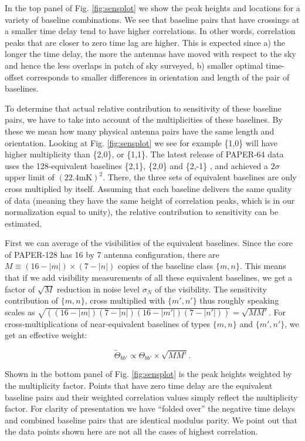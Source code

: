 \documentclass[twocolumn,apj,numberedappendix]{emulateapj}
\renewcommand\[{\begin{equation}}
\renewcommand\]{\end{equation}}
\begin{document}
In the top panel of Fig. \ref{fig:sensplot}
we show the peak heights and locations for a variety of baseline combinations.
We see that baseline pairs that have crossings at a smaller time delay
tend to have higher correlations. In other words, correlation peaks
that are closer to zero time lag are higher. This is expected since
a) the longer the time delay, the more the antennas have moved with respect
to the sky and hence the less overlaps in patch of sky surveyed, b) smaller optimal
time-offset corresponds to smaller differences in orientation and length of the 
pair of baselines. 




To determine that actual relative contribution to sensitivity of these
baseline pairs, we have to take into account of the multiplicities of
these baselines. By these we mean how many physical antenna pairs have the
same length and orientation. Looking at Fig. \ref{fig:sensplot}
we see for example \{1,0\} will have higher multiplicity than \{2,0\},
or \{1,1\}. The latest release of PAPER-64 data uses the 128-equivalent baselines \{2,1\},
\{2,0\} and \{2,-1\} \citep{Ali2015}, and achieved a $2\sigma$ upper
limit of $(22.4\text{mK})^{2}$. There, the three sets of equivalent baselines
are only cross multiplied by itself. Assuming that each baseline delivers
the same quality of data (meaning they have the same height of correlation
peaks, which is in our normalization equal to unity), the relative
contribution to sensitivity can be estimated. 

First we can average of the visibilities of the equivalent baselines. Since the core of PAPER-128 has 16 by 7 antenna configuration, there
are $M\equiv(16-|m|)\times(7-|n|)$ copies of the baseline class $\{m,n\}$. This means
that if we add visibility measurements of all these equivalent baselines,
we get a factor of $\sqrt{M}$ reduction in noise
level $\sigma_N$ of the visibility. The sensitivity contribution of $\{m,n\}$, cross multiplied with $\{m',n'\}$  thus roughly speaking scales as $\sqrt{\left((16-|m|)(7-|n|)(16-|m'|)(7-|n'|)\right)}=\sqrt{MM'}$.
For cross-multiplications of near-equivalent baselines of
types $\{m,n\}$ and $\{m',n'\}$, we get an effective weight: 

\begin{equation}
\widetilde{\Theta}_{bb'} \propto \Theta_{bb'}\times\sqrt{MM'}.\label{eq:sensul}
\end{equation}

Shown in the bottom panel of Fig. \ref{fig:sensplot} is the peak heights weighted
by the multiplicity factor. Points that have zero time delay are the equivalent baseline pairs and their weighted correlation values simply reflect the multiplicity factor. For clarity of presentation we have ``folded over'' the negative time delays and combined baseline pairs that are identical modulus parity. We point out that the data points shown here are not all the cases of highest correlation.  
\end{document}

